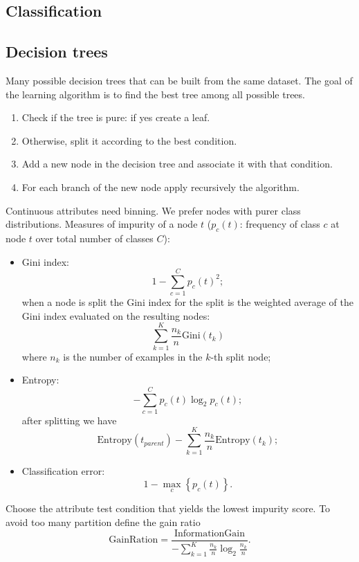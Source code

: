 \documentclass[a4paper,9pt]{extarticle}
\begin{document}
\begin{multicols*}{2}
\section{Classification}
\subsection{Decision trees}
Many possible decision trees that can be built from the
same dataset. The goal of the learning algorithm is to find the best tree among all possible
trees.
\begin{riquadro}
	\begin{enumerate}
		\item Check if the tree is pure: if yes create a leaf.
		\item Otherwise, split it according to the best condition.
		\item Add a new node in the decision tree and associate it with that condition.
		\item For each branch of the new node apply recursively the algorithm.
	\end{enumerate}
\end{riquadro}
Continuous attributes need binning. We prefer nodes with purer class distributions. Measures of impurity of a node $t$ ($p_{c}(t)$: frequency of class $c$ at node $t$ over total number of classes $C$):
\begin{itemize}
	\item Gini index:
	\begin{equation*}
		1-\sum_{c=1}^{C}p_{c}(t)^{2};
	\end{equation*}
	when a node is split the Gini index for the split is the weighted average of the Gini index evaluated on the resulting nodes:
	\begin{equation*}
		\sum_{k=1}^{K}\frac{n_{k}}{n}\mathrm{Gini}(t_{k})
	\end{equation*}
	where $n_{k}$ is the number of examples in the $k$-th split node;
	\item Entropy:
	\begin{equation*}
		-\sum_{c=1}^{C}p_{c}(t)\log_{2}p_{c}(t);
	\end{equation*}
	after splitting we have
	\begin{equation*}
		\mathrm{Entropy}(t_{parent})-\sum_{k=1}^{K}\frac{n_{k}}{n}\mathrm{Entropy}(t_{k});
	\end{equation*}
	\item Classification error:
	\begin{equation*}
		1-\max_{c}\left\{p_{c}(t)\right\}.
	\end{equation*}
\end{itemize}
Choose the attribute test condition that yields the lowest impurity score. To avoid too many partition define the gain ratio
\begin{equation*}
	\text{GainRation}=\frac{\text{InformationGain}}{-\sum_{k=1}^{K}\frac{n_{k}}{n}\log_{2}\frac{n_{k}}{n}}.
\end{equation*}

\end{multicols*}
\end{document}
